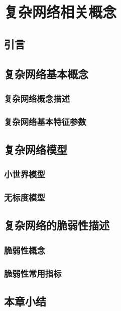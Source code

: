 \chapter{复杂网络相关概念}
\label{cha:model}

\section{引言}
\label{sec:index2}



\section{复杂网络基本概念}
\label{sec:powersys}



\subsection{复杂网络概念描述}
\label{sec:composite}



\subsection{复杂网络基本特征参数}
\label{sec:feature}



\section{复杂网络模型}
\label{sec:wind}


\subsection{小世界模型}
\label{sec:windEffects}



\subsection{无标度模型}
\label{sec:windModel}



\section{复杂网络的脆弱性描述}
\label{sec:load}



\subsection{脆弱性概念}
\label{sec:loadEffect}




\subsection{脆弱性常用指标}
\label{sec:loadModel}




\section{本章小结}
\label{sec:sum2}





